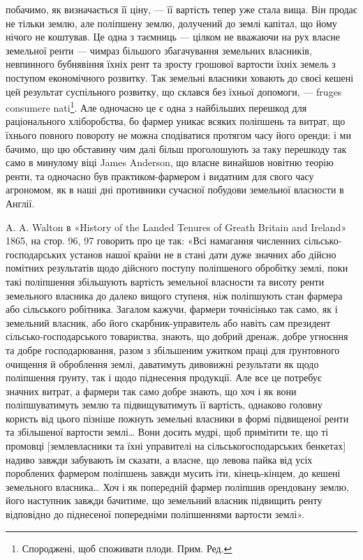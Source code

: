 \parcont{}  %
побачимо, як визначається її ціну, — її вартість тепер уже стала вища. Він продає
не тільки землю, але поліпшену землю, долучений до землі капітал, що йому
нічого не коштував. Це одна з таємниць — цілком не вважаючи на рух власне
земельної ренти — чимраз більшого збагачування земельних власників, невпинного бубнявіння їхніх рент
та зросту грошової вартости їхніх земель з поступом
економічного розвитку. Так земельні власники ховають до своєї кешені цей
результат суспільного розвитку, що склався без їхньої допомоги, — fruges consumere nati\footnote*{
Спороджені, щоб споживати плоди. Прим. Ред.
}. Але
одночасно це є одна з найбільших перешкод для раціонального хліборобства, бо фармер уникає всяких
поліпшень та витрат, що їхнього
повного повороту не можна сподіватися протягом часу його оренди; і ми
бачимо, що цю обставину чим далі більш проголошують за таку перешкоду
так само в минулому віці James Anderson, що власне винайшов новітню теорію
ренти, та одночасно був практиком-фармером і видатним для свого часу агрономом, як в наші дні
противники сучасної побудови земельної власности в Англії.

A. A. Walton в «History of the Landed Tenures of Greath Britain and
Ireland» 1865, на стор. 96, 97 говорить про це так: «Всі намагання численних
сільсько-господарських установ нашої країни не в стані дати дуже значних або
дійсно помітних результатів щодо дійсного поступу поліпшеного обробітку землі,
поки такі поліпшення збільшують вартість земельної власности та висоту ренти
земельного власника до далеко вищого ступеня, ніж поліпшують стан фармера
або сільського робітника. Загалом кажучи, фармери точнісінько так само, як
і земельний власник, або його скарбник-управитель або навіть сам президент
сільсько-господарського товариства, знають, що добрий дренаж, добре угноєння та добре
господарювання, разом з збільшеним ужитком праці для
ґрунтовного очищення й оброблення землі, даватимуть дивовижні результати
як щодо поліпшення ґрунту, так і щодо піднесення продукції. Але все це
потребує значних витрат, а фармери так само добре знають, що хоч і як
вони поліпшуватимуть землю та підвищуватимуть її вартість, однаково головну користь від цього
пізніше пожнуть земельні власники в формі підвищеної ренти та збільшеної вартости землі\dots{} Вони
досить мудрі, щоб
примітити те, що ті промовці [землевласники та їхні управителі на сільськогосподарських
бенкетах] надиво завжди забувають їм сказати, а власне, що
левова пайка від усіх пороблених фармером поліпшень завжди мусить іти,
кінець-кінцем, до кешені земельного власника\dots{} Хоч і як попередній фармер
поліпшив орендовану землю, його наступник завжди бачитиме, що земельний
власник підвищить ренту відповідно до піднесеної попередніми поліпшеннями
вартости землі».

